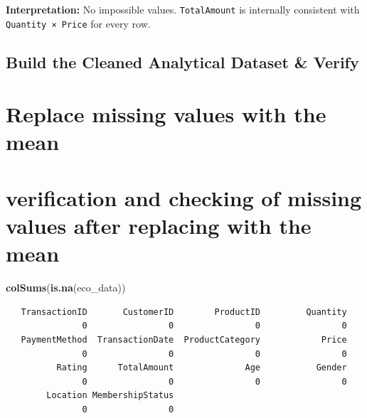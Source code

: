 \documentclass[
]{article}
\newenvironment{Shaded}{\begin{snugshade}}{\end{snugshade}}
\newcommand{\AttributeTok}[1]{\textcolor[rgb]{0.13,0.29,0.53}{#1}}
\newcommand{\ConstantTok}[1]{\textcolor[rgb]{0.56,0.35,0.01}{#1}}
\newcommand{\FunctionTok}[1]{\textcolor[rgb]{0.13,0.29,0.53}{\textbf{#1}}}
\newcommand{\NormalTok}[1]{#1}
\newcommand{\OtherTok}[1]{\textcolor[rgb]{0.56,0.35,0.01}{#1}}
\newcommand{\SpecialCharTok}[1]{\textcolor[rgb]{0.81,0.36,0.00}{\textbf{#1}}}
\begin{document}
\textbf{Interpretation:} No impossible values. \texttt{TotalAmount} is
internally consistent with \texttt{Quantity\ ×\ Price} for every row.

\subsection{Build the Cleaned Analytical Dataset \&
Verify}\label{build-the-cleaned-analytical-dataset-verify}

\section{Replace missing values with the
mean}\label{replace-missing-values-with-the-mean}

\begin{Shaded}
\end{Shaded}

\section{verification and checking of missing values after replacing
with the
mean}\label{verification-and-checking-of-missing-values-after-replacing-with-the-mean}

\begin{Shaded}
\begin{Highlighting}[]
\FunctionTok{colSums}\NormalTok{(}\FunctionTok{is.na}\NormalTok{(eco\_data))}
\end{Highlighting}
\end{Shaded}

\begin{verbatim}
   TransactionID       CustomerID        ProductID         Quantity 
               0                0                0                0 
   PaymentMethod  TransactionDate  ProductCategory            Price 
               0                0                0                0 
          Rating      TotalAmount              Age           Gender 
               0                0                0                0 
        Location MembershipStatus 
               0                0 
\end{verbatim}
\end{document}
